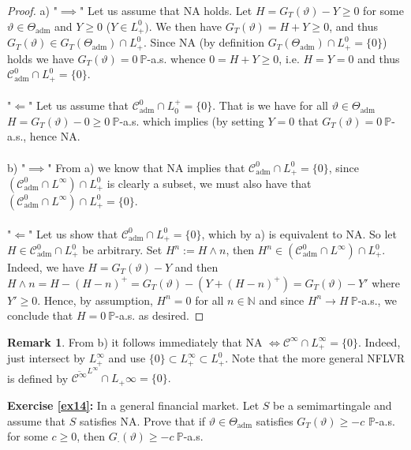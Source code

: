 \documentclass[12pt,a4paper, twoside]{article}
\theoremstyle{definition}
\newtheorem{rem}{Remark}[section]
\newcommand{\PP}{\mathbb{P}} %
\begin{document}
\begin{proof} a) "$\implies$" Let us assume that NA holds. Let $H=G_T( \vartheta)-Y \geq 0$ for some $\vartheta \in \Theta_\text{adm}$ and $Y \geq 0$ ($Y \in L_+^0)$. We then have $G_T( \vartheta)=H+Y \geq 0$, and thus $G_T( \vartheta) \in G_T( \Theta_\text{adm}) \cap L_+^0$. Since NA (by definition $G_T( \Theta_\text{adm}) \cap L_+^0 = \{0\}$) holds we have $G_T( \vartheta)=0 \ \PP$-a.s. whence $0=H+Y \geq 0$, i.e. $H=Y=0$ and thus $\mathcal{C}_\text{adm}^0 \cap L_+^0 = \{0\}$.
\\
\\
"$\Longleftarrow$" Let us assume that $\mathcal{C}_\text{adm}^0 \cap L_0^+=\{0\}$. That is we have for all $\vartheta \in \Theta_\text{adm}$ $H=G_T( \vartheta)-0 \geq 0 \ \PP$-a.s. which implies (by setting $Y=0$ that $G_T( \vartheta) =0 \ \PP$-a.s., hence NA. 
\\\\
b) "$\implies$" From a) we know that NA implies that $\mathcal{C}_\text{adm}^0 \cap L_+^0 = \{0\}$, since $(\mathcal{C}_\text{adm}^0 \cap L^\infty) \cap L_+^0$ is clearly a subset, we must also have that $(\mathcal{C}_\text{adm}^0 \cap L^\infty) \cap L_+^0 = \{0\}$.\\
\\
"$\Longleftarrow$" Let us show that $\mathcal{C}_\text{adm}^0 \cap L_+^0 = \{0\}$, which by a) is equivalent to NA. So let $H \in \mathcal{C}_\text{adm}^0 \cap L_+^0$ be arbitrary. Set $H^n:= H \wedge n$, then $H^n \in ( \mathcal{C}_\text{adm}^0 \cap L^\infty) \cap L_+^0$. Indeed, we have $H= G_T( \vartheta)-Y$ and then $H \wedge n = H-(H-n)^+ = G_T( \vartheta)-(Y+(H-n)^+)= G_T( \vartheta)-Y'$ where $Y' \geq 0$. Hence, by assumption, $H^n=0$ for all $n \in \mathbb{N}$ and since $H^n \to H \ \PP$-a.s., we conclude that $H=0 \ \PP$-a.s. as desired. 
\end{proof}
\begin{rem} From b) it follows immediately that NA $\iff \mathcal{C}^\infty \cap L_+^\infty = \{0\}$. Indeed, just intersect by $L_+^\infty$ and use $\{0 \} \subset L_+^\infty \subset L_+^0$. Note that the more general NFLVR is defined by $\overline{\mathcal{C}^\infty}^{L^\infty} \cap L_+\infty = \{0\}.$
\end{rem}
\newpage
\noindent \textbf{Exercise \ref{ex14}:} In a general financial market. Let $S$ be a semimartingale and assume that $S$ satisfies NA. Prove that if $\vartheta \in \Theta_\text{adm}$ satisfies $G_T( \vartheta) \geq -c$ $\PP$-a.s. for some $c \geq 0$, then $G_\cdot ( \vartheta) \geq - c \ \PP$-a.s.
\end{document}
